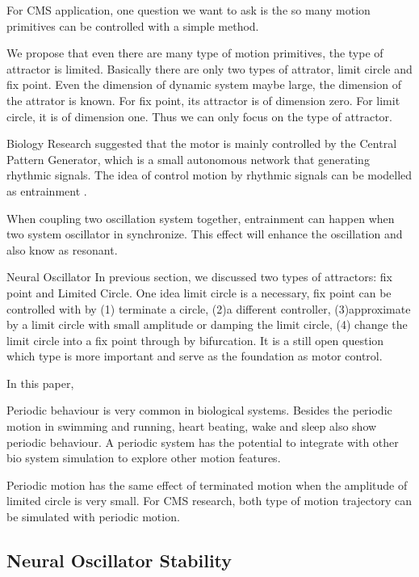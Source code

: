 For CMS application, one question we want to ask is the so many motion primitives can be controlled with a simple method.

We propose that even there are many type of motion primitives, the type of attractor is limited. Basically there are only two types of attrator, limit circle and fix point.
Even the dimension of dynamic system maybe large, the dimension of the attrator is known. 
For fix point, its attractor is of dimension zero.
For limit circle, it is of dimension one.
Thus we can only focus on the type of attractor.



Biology Research suggested that the motor is mainly controlled by the Central Pattern Generator, which is a small autonomous network that generating rhythmic signals.
The idea of control motion by rhythmic signals can be modelled as entrainment \citep{Gonz'alez-Miranda2004}.

When coupling two oscillation system together, entrainment can happen when two system oscillator in synchronize. This effect will enhance the oscillation and also know as resonant. 



Neural Oscillator
In previous section, we discussed two types of attractors: fix point and Limited Circle. One idea limit circle is a necessary, fix point can be controlled with by (1) terminate a circle, (2)a different controller, (3)approximate by a limit circle with small amplitude or damping the limit circle, (4) change the limit circle into a fix point through by bifurcation. It is a still open question which type is more important and serve as the foundation as motor control.


In this paper, 
\begin{itemize}
\HiItem Periodic behaviour is very common in biological systems. 
Besides the periodic motion in swimming and running, heart beating, wake and sleep also show periodic behaviour.
A periodic system has the potential to integrate with other bio system simulation to explore other motion features.

\HiItem Periodic motion has the same effect of terminated motion when the amplitude of limited circle is very small. 
For CMS research, both type of motion trajectory can be simulated with periodic motion.

\end{itemize}

\subsection{Neural Oscillator Stability}

